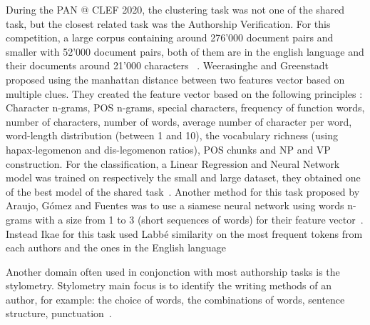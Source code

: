 During the PAN @ CLEF 2020, the clustering task was not one of the shared task, but the closest related task was the Authorship Verification.
For this competition, a large corpus containing around 276'000 document pairs and smaller with 52'000 document pairs, both of them are in the english language and their documents around 21'000 characters ~\cite{overview_pan20}.
Weerasinghe and Greenstadt proposed using the manhattan distance between two features vector based on multiple clues.
They created the feature vector based on the following principles : Character n-grams, POS n-grams, special characters, frequency of function words, number of characters, number of words, average number of character per word, word-length distribution (between 1 and 10), the vocabulary richness (using hapax-legomenon and dis-legomenon ratios), POS chunks and NP and VP construction.
For the classification, a Linear Regression and Neural Network model was trained on respectively the small and large dataset, they obtained one of the best  model of the shared task~\cite{feature_vector_pan20}.
Another method for this task proposed by Araujo, Gómez and Fuentes was to use a siamese neural network using words n-grams with a size from 1 to 3 (short sequences of words) for their feature vector~\cite{siamese_network_pan20}.
Instead Ikae for this task used Labbé similarity on the most frequent tokens from each authors and the ones in the English language~\cite{unine_pan20}

Another domain often used in conjonction with most authorship tasks is the stylometry.
Stylometry main focus is to identify the writing methods of an author, for example: the choice of words, the combinations of words, sentence structure, punctuation~\cite{savoy_stylo}.
